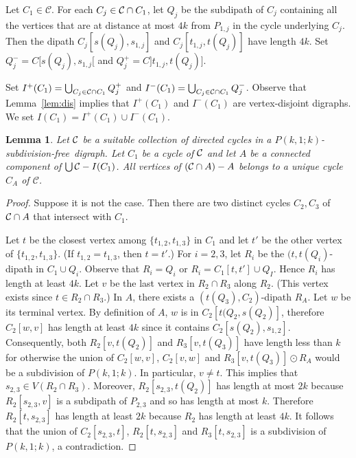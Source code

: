 \documentclass[utf8,10pt]{article}
\theoremstyle{plain}
\newtheorem{lemma}[theorem]{Lemma}
\theoremstyle{definition}
\theoremstyle{remark}
\newcommand{\free}{subdivision-free}
\begin{document}
Let $C_1\in \mathcal{C}$.
For each $C_j\in {\cal C} \cap C_1$, let $Q_j$ be the subdipath of $C_j$ 
containing all the vertices that are at distance at most $4k$ from $P_{1,j}$ in the cycle underlying $C_j$.
Then the dipath $C_j[s(Q_j), s_{1,j}]$ and  $C_j[t_{1,j},t (Q_j)]$ have length $4k$.
Set $Q^-_j=C[s(Q_j), s_{1,j}[$ and $Q^+_j=C]t_{1,j}, t(Q_j)]$.


Set $I^+(C_1) = \bigcup_{C_j\in {\cal C}\cap C_1} Q^+_j$ and $I^-(C_1) = \bigcup_{C_j\in {\cal C}\cap C_1} Q^-_j$.
Observe that Lemma~\ref{lem:dis} implies that $I^+(C_1)$ and $I^-(C_1)$ are vertex-disjoint digraphs. We set $I(C_1)=I^+(C_1)\cup I^-(C_1)$.




\begin{lemma}\label{lem:A}
Let ${\cal C}$ be a suitable collection of directed cycles in a $P(k,1;k)$-\free\ digraph.
Let $C_1$ be a cycle of ${\cal C}$ and let $A$ be a connected component of $\bigcup{\cal C} - I(C_1)$.
All vertices of $({\cal C}\cap A)  - A$ belongs to a unique cycle $C_A$ of $\mathcal{C}$.
\end{lemma}

\begin{proof}
Suppose it is not the case. Then there are two distinct cycles $C_2, C_3$ of ${\cal C}\cap A$ that intersect with $C_1$.

Let $t$ be the closest vertex among $\{t_{1,2}, t_{1,3}\}$ in $C_1$ and let $t'$ be the other vertex of $\{t_{1,2}, t_{1,3}\}$.
(If $t_{1,2}=t_{1,3}$, then $t=t'$.) For $i=2,3$, let $R_i$ be the $(t,t(Q_i)$-dipath in $C_1\cup Q_i$. Observe that $R_i=Q_i$ or $R_i=C_1[t,t']\cup Q_I$. Hence $R_i$ has length at least $4k$.
Let $v$ be the last vertex in $R_2\cap R_3$ along $R_2$. (This vertex exists since $t\in R_2\cap R_3$.) In $A$, there exists a $(t(Q_3), C_2)$-dipath $R_A$. Let $w$ be its terminal vertex. By definition of $A$, $w$ is in $C_2[t(Q_2, s(Q_2)]$, therefore $C_2[w,v]$ has length at least $4k$ since it contains $C_2[s(Q_2), s_{1,2}]$. Consequently, both $R_2[v,t(Q_2)]$ and $R_3[v,t(Q_3)]$ have length less than $k$ for otherwise the union of $C_2[w,v]$, $C_2[v,w]$ and $R_3[v,t(Q_3)]\odot R_A$ would be a subdivision of $P(k,1;k)$.
In particular, $v\neq t$. This implies that $s_{2,3}\in V(R_2\cap R_3)$.
Moreover, $R_2[s_{2,3}, t(Q_2)]$ has length at most $2k$ because $R_2[s_{2,3},v]$ is a subdipath of $P_{2,3}$ and so has length at most $k$.
Therefore $R_2[t,s_{2,3}]$ has length at least $2k$ because $R_2$ has length at least $4k$.
It follows that the union of $C_2[s_{2,3},t]$,  $R_2[t,s_{2,3}]$ and  $R_3[t,s_{2,3}]$ is a subdivision of $P(k,1;k)$, a contradiction.
\end{proof}
\end{document}
